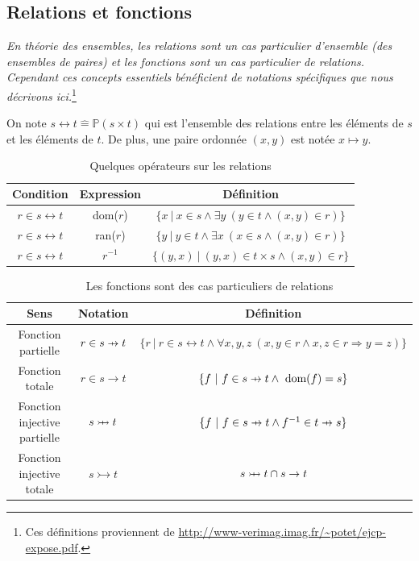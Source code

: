 \documentclass[10pt,a4paper]{article}
\newcommand{\Bequal}{\mathrel{\widehat{=}}}
\def\p#1{\mathrel{\ooalign{\hfil$\mapstochar\mkern 5mu$\hfil\cr$#1$}}}
\def \pfun  {\p\rightarrow}
\begin{document}
\subsection{Relations et fonctions}

\emph{En théorie des ensembles, les relations sont un cas particulier d'ensemble (des ensembles de paires) et les fonctions sont un cas particulier de relations. Cependant ces concepts essentiels bénéficient de notations spécifiques que nous décrivons ici.}\footnote{Ces définitions proviennent de \url{http://www-verimag.imag.fr/~potet/ejcp-expose.pdf}.}

On note  $ s \leftrightarrow t \Bequal \mathbb{P}(s \times t)$ qui est l'ensemble des relations entre les éléments de $s$ et les éléments de $t$. De plus, une paire ordonnée $(x, y)$ est notée $x \mapsto y$.

{\arraycolsep=1.4pt
\renewcommand{\arraystretch}{2}
\begin{table}
\centering
\begin{tabular}[h]{|c | c | c|}
\hline
\bf Condition & \bf Expression &  \bf Définition \tabularnewline
\hline 
$r \in s \leftrightarrow t$ & dom($r$) & $\{ x~|~x\in s \wedge \exists y~(y \in t \wedge (x, y)  \in r)\}$  \tabularnewline
$r \in s \leftrightarrow t$ & ran($r$) & $\{y~|~y \in t \wedge \exists x~(x \in s \wedge (x, y) \in r)\}$ \tabularnewline
$r \in s \leftrightarrow t$ & $r^{-1}$ & $\{(y, x)~|~(y, x) \in t \times s \wedge (x, y) \in r\}$ \tabularnewline
\hline
\end{tabular}
\caption{Quelques opérateurs sur les relations}
\end{table}
}

{\arraycolsep=1.4pt
\renewcommand{\arraystretch}{2}
\begin{table}
\centering
\begin{tabular}[h]{|c | c | c|}
\hline
\bf Sens & \bf Notation &  \bf Définition \tabularnewline
\hline 
Fonction partielle & $r \in s \pfun t$ & $\{ r~|~r \in s \leftrightarrow t \wedge \forall x, y, z~(x,y \in r \wedge x,z \in r \Rightarrow y=z )\}$  \tabularnewline
Fonction totale &  $r \in s \rightarrow t$ & $\{f~|~f \in s \pfun t \wedge \text{ dom}(f) = s\}$ \tabularnewline
Fonction injective partielle & $s \p\rightarrowtail t$ & $\{f~|~f \in s \pfun t \wedge f^{-1} \in  t \pfun s\}$ \tabularnewline
Fonction injective totale & $s \rightarrowtail t$ & $s \p\rightarrowtail t \cap s \rightarrow t$ \tabularnewline 
\hline
\end{tabular}
\caption{Les fonctions sont des cas particuliers de relations}
\end{table}
}
\end{document}
